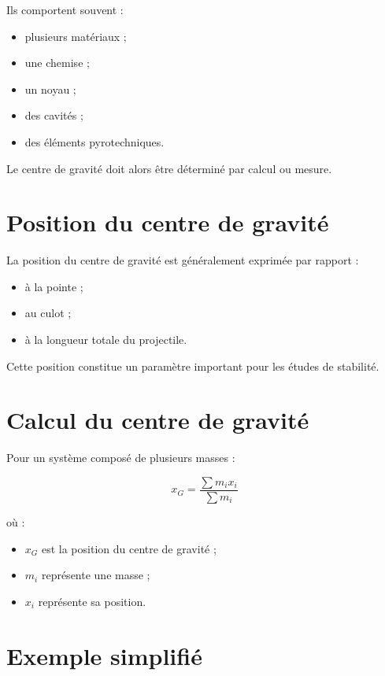 Ils comportent souvent :

\begin{itemize}
    \item plusieurs matériaux ;
    \item une chemise ;
    \item un noyau ;
    \item des cavités ;
    \item des éléments pyrotechniques.
\end{itemize}

Le centre de gravité doit alors être déterminé par calcul ou mesure.

\section{Position du centre de gravité}

La position du centre de gravité est généralement exprimée par rapport :

\begin{itemize}
    \item à la pointe ;
    \item au culot ;
    \item à la longueur totale du projectile.
\end{itemize}

Cette position constitue un paramètre important pour les études de stabilité.

\section{Calcul du centre de gravité}

Pour un système composé de plusieurs masses :

\begin{equation}
x_G =
\frac{\sum m_i x_i}
     {\sum m_i}
\end{equation}

où :

\begin{itemize}
    \item $x_G$ est la position du centre de gravité ;
    \item $m_i$ représente une masse ;
    \item $x_i$ représente sa position.
\end{itemize}

\section{Exemple simplifié}

